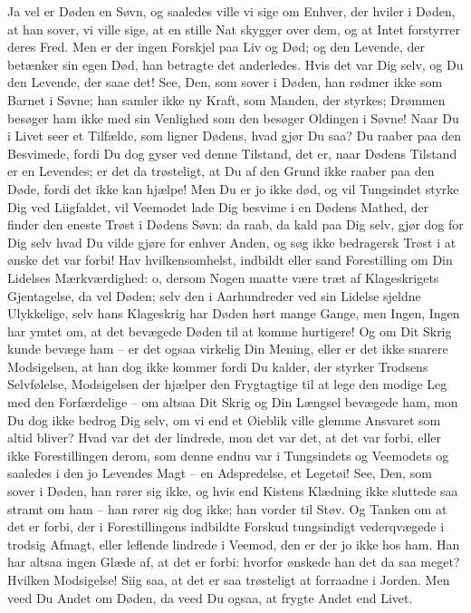 \documentclass[12pt,a4paper]{article}
\begin{document}
Ja vel er Døden en Søvn, og saaledes ville vi sige om Enhver, der hviler i Døden, at han sover, vi ville sige, at en stille Nat skygger over dem, og at Intet forstyrrer deres Fred. Men er der ingen Forskjel paa Liv og Død; og den Levende, der betænker sin egen Død, han betragte det anderledes. Hvis det var Dig selv, og Du den Levende, der saae det! See, Den, som sover i Døden, han rødmer ikke som Barnet i Søvne; han samler ikke ny Kraft, som Manden, der styrkes; Drømmen besøger ham ikke med sin Venlighed som den besøger Oldingen i Søvne! Naar Du i Livet seer et Tilfælde, som ligner Dødens, hvad gjør Du saa? Du raaber paa den Besvimede, fordi Du dog gyser ved denne Tilstand, det er, naar Dødens Tilstand er en Levendes; er det da trøsteligt, at Du af den Grund ikke raaber paa den Døde, fordi det ikke kan hjælpe! Men Du er jo ikke død, og vil Tungsindet styrke Dig ved Liigfaldet, vil Veemodet lade Dig besvime i en Dødens Mathed, der finder den eneste Trøst i Dødens Søvn: da raab, da kald paa Dig selv, gjør dog for Dig selv hvad Du vilde gjøre for enhver Anden, og søg ikke bedragersk Trøst i at ønske det var forbi! Hav hvilkensomhelst, indbildt eller sand Forestilling om Din Lidelses Mærkværdighed: o, dersom Nogen maatte være træt af Klageskrigets Gjentagelse, da vel Døden; selv den i Aarhundreder ved sin Lidelse sjeldne Ulykkelige, selv hans Klageskrig har Døden hørt mange Gange, men Ingen, Ingen har ymtet om, at det bevægede Døden til at komme hurtigere! Og om Dit Skrig kunde bevæge ham – er det ogsaa virkelig Din Mening, eller er det ikke snarere Modsigelsen, at han dog ikke kommer fordi Du kalder, der styrker Trodsens Selvfølelse, Modsigelsen der hjælper den Frygtagtige til at lege den modige Leg med den Forfærdelige – om altsaa Dit Skrig og Din Længsel bevægede ham, mon Du dog ikke bedrog Dig selv, om vi end et Øieblik ville glemme Ansvaret som altid bliver? Hvad var det der lindrede, mon det var det, at det var forbi, eller ikke Forestillingen derom, som denne endnu var i Tungsindets og Veemodets og saaledes i den jo Levendes Magt – en Adspredelse, et Legetøi! See, Den, som sover i Døden, han rører sig ikke, og hvis end Kistens Klædning ikke sluttede saa stramt om ham – han rører sig dog ikke; han vorder til Støv. Og Tanken om at det er forbi, der i Forestillingens indbildte Forskud tungsindigt vederqvægede i trodsig Afmagt, eller leflende lindrede i Veemod, den er der jo ikke hos ham. Han har altsaa ingen Glæde af, at det er forbi: hvorfor ønskede han det da saa meget? Hvilken Modsigelse! Siig saa, at det er saa trøsteligt at forraadne i Jorden. Men veed Du Andet om Døden, da veed Du ogsaa, at frygte Andet end Livet.
\end{document}
